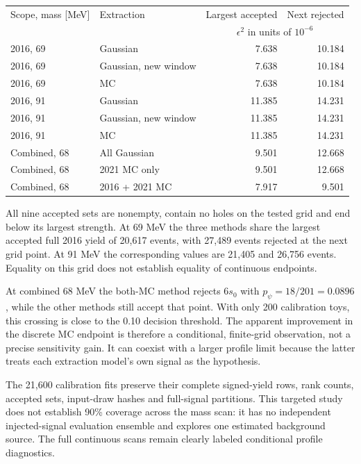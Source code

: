\documentclass[11pt]{article}
\begin{document}
\begin{center}\small\begin{tabular}{llrr}\toprule
Scope, mass [MeV] & Extraction & Largest accepted & Next rejected\\
& & \multicolumn{2}{c}{$\epsilon^2$ in units of $10^{-6}$}\\\midrule
2016, 69 & Gaussian & 7.638 & 10.184\\
2016, 69 & Gaussian, new window & 7.638 & 10.184\\
2016, 69 & MC & 7.638 & 10.184\\
2016, 91 & Gaussian & 11.385 & 14.231\\
2016, 91 & Gaussian, new window & 11.385 & 14.231\\
2016, 91 & MC & 11.385 & 14.231\\
Combined, 68 & All Gaussian & 9.501 & 12.668\\
Combined, 68 & 2021 MC only & 9.501 & 12.668\\
Combined, 68 & 2016 + 2021 MC & 7.917 & 9.501\\\bottomrule\end{tabular}\end{center}

All nine accepted sets are nonempty, contain no holes on the tested grid and end below its largest strength. At 69 MeV the three methods share the largest accepted full 2016 yield of 20,617 events, with 27,489 events rejected at the next grid point. At 91 MeV the corresponding values are 21,405 and 26,756 events. Equality on this grid does not establish equality of continuous endpoints.

At combined 68 MeV the both-MC method rejects $6s_0$ with $p_\psi=18/201=0.0896$, while the other methods still accept that point. With only 200 calibration toys, this crossing is close to the 0.10 decision threshold. The apparent improvement in the discrete MC endpoint is therefore a conditional, finite-grid observation, not a precise sensitivity gain. It can coexist with a larger profile limit because the latter treats each extraction model's own signal as the hypothesis.

The 21,600 calibration fits preserve their complete signed-yield rows, rank counts, accepted sets, input-draw hashes and full-signal partitions. This targeted study does not establish 90\% coverage across the mass scan: it has no independent injected-signal evaluation ensemble and explores one estimated background source. The full continuous scans remain clearly labeled conditional profile diagnostics.
\end{document}
